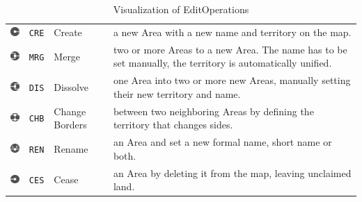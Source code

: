 \begin{table}[H]
\begin{center}
\begin{tabular}{m{0.75cm} m{0.8cm} m{2.4cm} m{9.1cm}}
  \raisebox{-0.35\height}
  {\includegraphics[width=0.75cm]{graphics/development/edit_operations/CRE}} &
  \texttt{CRE} & Create &
  a new Area with a new name and territory on the map. \\

  \raisebox{-0.35\height}
  {\includegraphics[width=0.75cm]{graphics/development/edit_operations/MRG}} &
  \texttt{MRG} & Merge &
  two or more Areas to a new Area. The name has to be set manually, the territory is automatically unified. \\

  \raisebox{-0.35\height}
  {\includegraphics[width=0.75cm]{graphics/development/edit_operations/DIS}} &
  \texttt{DIS} & Dissolve &
  one Area into two or more new Areas, manually setting their new territory and name. \\

  \raisebox{-0.35\height}
  {\includegraphics[width=0.75cm]{graphics/development/edit_operations/CHB}} &
  \texttt{CHB} & Change Borders &
  between two neighboring Areas by defining the territory that changes sides. \\

  \raisebox{-0.35\height}
  {\includegraphics[width=0.75cm]{graphics/development/edit_operations/REN}} &
  \texttt{REN} & Rename &
  an Area and set a new formal name, short name or both. \\

  \vspace{0.35em}
  \raisebox{-0.35\height}
  {\includegraphics[width=0.75cm]{graphics/development/edit_operations/CES}} &
  \texttt{CES} & Cease &
  an Area by deleting it from the map, leaving unclaimed land. \\

\end{tabular}
\caption{Visualization of EditOperations}
\label{tab:hivent_to_hg_operations}
\end{center}
\end{table}

